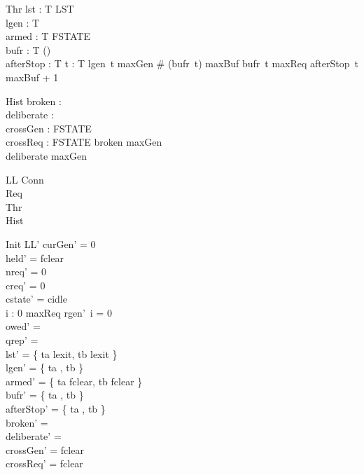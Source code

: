 \documentclass[a4paper,10pt,fleqn]{article}
\begin{document}
\begin{schema}{Thr}
  lst : T \fun LST \\
  lgen : T \fun \nat \\
  armed : T \fun FSTATE \\
  bufr : T \fun (\power \nat) \\
  afterStop : T \fun \nat
\where
  \forall t : T \spot lgen~t \leq maxGen \land \# (bufr~t) \leq maxBuf
    \land bufr~t  \upto maxReq \land afterStop~t \leq maxBuf + 1
\end{schema}

\begin{schema}{Hist}
  broken : \power \nat \\
  deliberate : \power \nat \\
  crossGen : FSTATE \\
  crossReq : FSTATE
\where
  broken  \upto maxGen \\
  deliberate  \upto maxGen
\end{schema}

\begin{schema}{LL}
  Conn \\
  Req \\
  Thr \\
  Hist
\end{schema}

\begin{schema}{Init}
  LL'
\where
  curGen' = 0 \\
  held' = fclear \\
  nreq' = 0 \\
  creq' = 0 \\
  cstate' = cidle \\
  \forall i : 0 \upto maxReq \spot rgen'~i = 0 \\
  owed' = \emptyset \\
  qrep' = \emptyset \\
  lst' = \{ ta \mapsto lexit, tb \mapsto lexit \} \\
  lgen' = \{ ta , tb  \} \\
  armed' = \{ ta \mapsto fclear, tb \mapsto fclear \} \\
  bufr' = \{ ta \mapsto \emptyset, tb \mapsto \emptyset \} \\
  afterStop' = \{ ta , tb  \} \\
  broken' = \emptyset \\
  deliberate' = \emptyset \\
  crossGen' = fclear \\
  crossReq' = fclear
\end{schema}
\end{document}

